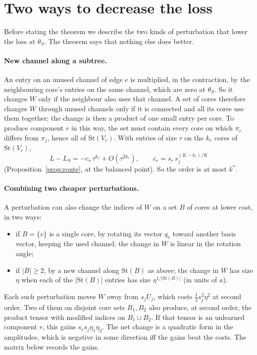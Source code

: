 \documentclass[11pt]{article}
\theoremstyle{definition}
\newcommand{\St}{\mathrm{St}}
\begin{document}
\section{Two ways to decrease the loss}\label{sec:mechanisms}

Before stating the theorem we describe the two kinds of perturbation that lower the loss at $\theta_S$. The
theorem says that nothing else does better.

\paragraph{New channel along a subtree.} An entry on an unused channel of edge $e$ is multiplied, in the
contraction, by the neighbouring core's entries on the same channel, which are zero at $\theta_S$. So it changes
$W$ only if the neighbour also uses that channel. A set of cores therefore changes $W$ through unused channels only
if it is connected and all its cores use them together; the change is then a product of one small entry per core.
To produce component $r$ in this way, the set must contain every core on which $\pi_r$ differs from $\pi_j$, hence
all of $\St(V_r)$. With entries of size $\tau$ on the $k_r$ cores of $\St(V_r)$,
\begin{equation}\label{eq:route}
L-L_S=-c_r\,\tau^{k_r}+O(\tau^{2k_r}),\qquad c_r=s_r\,s_j^{(K-k_r)/K}
\end{equation}
(Proposition~\ref{prop:route}, at the balanced point). So the order is at most $k^*$.

\paragraph{Combining two cheaper perturbations.} A perturbation can also change the indices of $W$ on a set
$B$ of cores at lower cost, in two ways:
\begin{itemize}
\item if $B=\{v\}$ is a single core, by rotating its vector $q_v$ toward another basis vector, keeping the used
channel; the change in $W$ is linear in the rotation angle;
\item if $\lvert B\rvert\ge2$, by a new channel along $\St(B)$ as above; the change in $W$ has size $\eta$ when each
of the $\lvert\St(B)\rvert$ entries has size $\eta^{1/\lvert\St(B)\rvert}$ (in units of $a$).
\end{itemize}
Each such perturbation moves $W$ away from $s_jU_j$, which costs $\frac12s_j^2\eta^2$ at second order. Two of them on
disjoint core sets $B_1,B_2$ also produce, at second order, the product tensor with modified indices on
$B_1\cup B_2$. If that tensor is an unlearned component $r$, this gains $s_rs_j\eta_1\eta_2$. The net change is a
quadratic form in the amplitudes, which is negative in some direction iff the gains beat the costs. The matrix below
records the gains.
\end{document}
